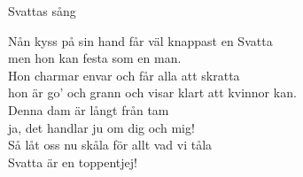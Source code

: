 \begin{song}{Svattas sång}

	
	
	Nån kyss på sin hand får väl knappast en Svatta\\
	men hon kan festa som en man.\\
	Hon charmar envar och får alla att skratta\\
	hon är go’ och grann och visar klart att kvinnor kan.\\
	Denna dam är långt från tam\\
	ja, det handlar ju om dig och mig!\\
	Så låt oss nu skåla för allt vad vi tåla\\
	Svatta är en toppentjej!

\end{song}
